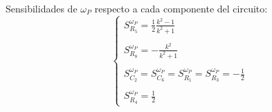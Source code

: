 Sensibilidades de $\omega_P$ respecto a cada componente del circuito:
\begin{equation}
\begin{cases}
S^{\omega_P}_{R_5} = \frac{1}{2} \frac{k^{2} - 1}{k^{2} + 1} \\ \\
S^{\omega_P}_{R_8} = - \frac{k^{2}}{k^{2} + 1}\\ \\
S^{\omega_P}_{C_2} = S^{\omega_P}_{C_6}= S^{\omega_P}_{R_1}=S^{\omega_P}_{R_3}=	-  \frac{1}{2}\\ \\
S^{\omega_P}_{R_4} = \frac{1}{2}
\end{cases}
\end{equation}
